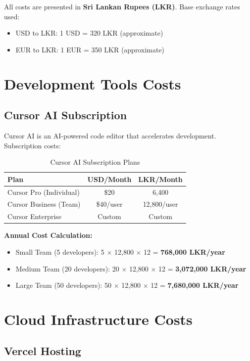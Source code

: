\documentclass[12pt,a4paper]{article}
\begin{document}
All costs are presented in \textbf{Sri Lankan Rupees (LKR)}. Base exchange rates used:
\begin{itemize}
    \item USD to LKR: 1 USD = 320 LKR (approximate)
    \item EUR to LKR: 1 EUR = 350 LKR (approximate)
\end{itemize}

\section{Development Tools Costs}

\subsection{Cursor AI Subscription}

Cursor AI is an AI-powered code editor that accelerates development. Subscription costs:

\begin{table}[H]
\centering
\begin{tabular}{|l|c|c|}
\hline
\textbf{Plan} & \textbf{USD/Month} & \textbf{LKR/Month} \\
\hline
Cursor Pro (Individual) & \$20 & 6,400 \\
Cursor Business (Team) & \$40/user & 12,800/user \\
Cursor Enterprise & Custom & Custom \\
\hline
\end{tabular}
\caption{Cursor AI Subscription Plans}
\end{table}

\textbf{Annual Cost Calculation:}
\begin{itemize}
    \item Small Team (5 developers): 5 × 12,800 × 12 = \textbf{768,000 LKR/year}
    \item Medium Team (20 developers): 20 × 12,800 × 12 = \textbf{3,072,000 LKR/year}
    \item Large Team (50 developers): 50 × 12,800 × 12 = \textbf{7,680,000 LKR/year}
\end{itemize}

\section{Cloud Infrastructure Costs}

\subsection{Vercel Hosting}
\end{document}
